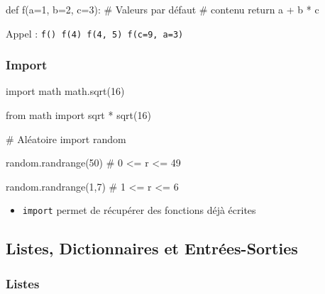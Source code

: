 \documentclass{beamer}
\let\oldsubsubsection\subsubsection
\renewcommand{\subsubsection}[2][]{\def\currentsubsubsection{#2}\oldsubsubsection[#1]{#2}}
\begin{document}
\begin{code}{\codebox}
def f(a=1, b=2, c=3): # Valeurs par défaut
    # contenu
    return a + b * c
\end{code}
\begin{frame}
  \usebox\codebox
  
  Appel : \lstinline{f() f(4) f(4, 5) f(c=9, a=3)}
\end{frame}

\subsubsection{Import}
\begin{code}{\codeboxa}
import math
math.sqrt(16)
  
from math import sqrt
                 *
sqrt(16)
\end{code}
\begin{code}{\codeboxb}
# Aléatoire
import random
  
random.randrange(50) # 0 <= r <= 49

random.randrange(1,7) # 1 <= r <= 6
\end{code}
\begin{frame}
  \begin{itemize}
  \item \lstinline{import} permet de récupérer des fonctions déjà écrites\\[0.6cm]
  \end{itemize}
  \begin{overprint}
    \usebox\codeboxa
    \usebox\codeboxb
  \end{overprint}
\end{frame}


\subsection{Listes, Dictionnaires et Entrées-Sorties}

\subsubsection{Listes}
\end{document}
